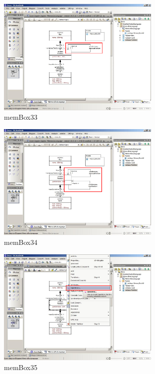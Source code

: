 \begin{figure}[htbp]
	\centering
  \includegraphics[width=0.7\textwidth]{pics/memBox33.png}
	\caption{memBox33}
	\label{memBox33}
\end{figure}

\begin{figure}[htbp]
	\centering
  \includegraphics[width=0.7\textwidth]{pics/memBox34.png}
	\caption{memBox34}
	\label{memBox34}
\end{figure}

\clearpage

\begin{figure}[htbp]
	\centering
  \includegraphics[width=0.7\textwidth]{pics/memBox35.png}
	\caption{memBox35}
	\label{memBox35}
\end{figure}

